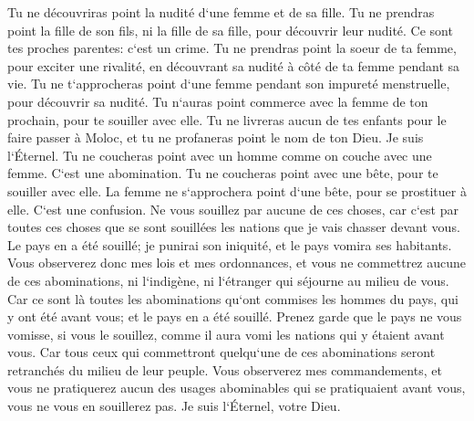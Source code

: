 \verse Tu ne découvriras point la nudité d`une femme et de sa fille. Tu ne prendras point la fille de son fils, ni la fille de sa fille, pour découvrir leur nudité. Ce sont tes proches parentes: c`est un crime. 
\verse Tu ne prendras point la soeur de ta femme, pour exciter une rivalité, en découvrant sa nudité à côté de ta femme pendant sa vie. 
\verse Tu ne t`approcheras point d`une femme pendant son impureté menstruelle, pour découvrir sa nudité. 
\verse Tu n`auras point commerce avec la femme de ton prochain, pour te souiller avec elle. 
\verse Tu ne livreras aucun de tes enfants pour le faire passer à Moloc, et tu ne profaneras point le nom de ton Dieu. Je suis l`Éternel. 
\verse Tu ne coucheras point avec un homme comme on couche avec une femme. C`est une abomination. 
\verse Tu ne coucheras point avec une bête, pour te souiller avec elle. La femme ne s`approchera point d`une bête, pour se prostituer à elle. C`est une confusion. 
\verse Ne vous souillez par aucune de ces choses, car c`est par toutes ces choses que se sont souillées les nations que je vais chasser devant vous. 
\verse Le pays en a été souillé; je punirai son iniquité, et le pays vomira ses habitants. 
\verse Vous observerez donc mes lois et mes ordonnances, et vous ne commettrez aucune de ces abominations, ni l`indigène, ni l`étranger qui séjourne au milieu de vous. 
\verse Car ce sont là toutes les abominations qu`ont commises les hommes du pays, qui y ont été avant vous; et le pays en a été souillé. 
\verse Prenez garde que le pays ne vous vomisse, si vous le souillez, comme il aura vomi les nations qui y étaient avant vous. 
\verse Car tous ceux qui commettront quelqu`une de ces abominations seront retranchés du milieu de leur peuple. 
\verse Vous observerez mes commandements, et vous ne pratiquerez aucun des usages abominables qui se pratiquaient avant vous, vous ne vous en souillerez pas. Je suis l`Éternel, votre Dieu. 

